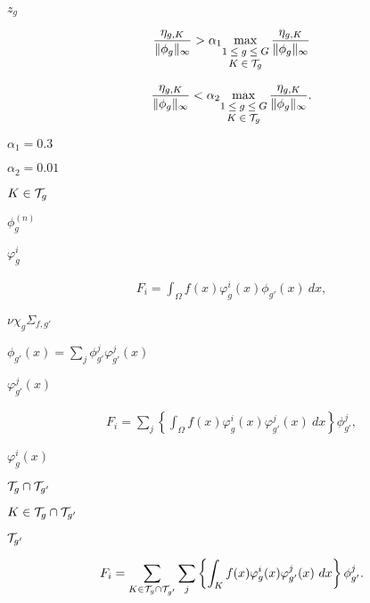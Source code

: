 \documentclass{article}
\begin{document}
$z_g$
\pagebreak

\begin{eqnarray*} \frac{\eta_{g,K}}{\|\phi_g\|_\infty} > \alpha_1 \displaystyle{\max_{\footnotesize \begin{matrix}1\le g\le G \\ K\in {\cal T}_g\end{matrix}} \frac{\eta_{g,K}}{\|\phi_g\|_\infty}} \end{eqnarray*}
\pagebreak

\begin{eqnarray*} \frac{\eta_{g,K}}{\|\phi_g\|_\infty} < \alpha_2 \displaystyle{\max_{\footnotesize \begin{matrix}1\le g\le G \\ K\in {\cal T}_g\end{matrix}} \frac{\eta_{g,K}}{\|\phi_g\|_\infty}}. \end{eqnarray*}
\pagebreak

$\alpha_1=0.3$
\pagebreak

$\alpha_2=0.01$
\pagebreak

$K\in {\cal T}_g$
\pagebreak

$\phi_g^{(n)}$
\pagebreak

$\varphi_g^i$
\pagebreak

\begin{eqnarray*} F_i = \int_\Omega f(x) \varphi_g^i(x) \phi_{g'}(x) \ dx, \end{eqnarray*}
\pagebreak

$\nu\chi_g\Sigma_{f,g'}$
\pagebreak

$\phi_{g'}(x)=\sum_j\phi_{g'}^j \varphi_{g'}^j(x)$
\pagebreak

$\varphi_{g'}^j(x)$
\pagebreak

\begin{eqnarray*} F_i = \sum_j \left\{\int_\Omega f(x) \varphi_g^i(x) \varphi_{g'}^j(x) \ dx \right\} \phi_{g'}^j , \end{eqnarray*}
\pagebreak

$\varphi_g^i(x)$
\pagebreak

${\cal T}_g \cap {\cal T}_{g'}$
\pagebreak

$K \in {\cal T}_g \cap {\cal T}_{g'}$
\pagebreak

${\cal T}_{g'}$
\pagebreak

\begin{eqnarray*} F_i = \sum_{K \in {\cal T}_g \cap {\cal T}_{g'}} \sum_j \left\{\int_K f(x) \varphi_g^i(x) \varphi_{g'}^j(x) \ dx \right\} \phi_{g'}^j. \end{eqnarray*}
\pagebreak
\end{document}
